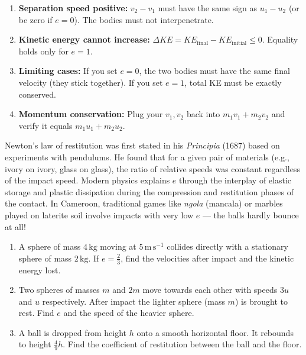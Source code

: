 \documentclass[11pt]{article}
\begin{document}
\begin{aretenir}
\begin{enumerate}
\item \textbf{Separation speed positive:} $v_2 - v_1$ must have the same sign as $u_1 - u_2$ (or be zero if $e=0$). The bodies must not interpenetrate.
\item \textbf{Kinetic energy cannot increase:} $\Delta KE = KE_{\text{final}} - KE_{\text{initial}} \le 0$. Equality holds only for $e=1$.
\item \textbf{Limiting cases:} If you set $e=0$, the two bodies must have the same final velocity (they stick together). If you set $e=1$, total KE must be exactly conserved.
\item \textbf{Momentum conservation:} Plug your $v_1, v_2$ back into $m_1v_1+m_2v_2$ and verify it equals $m_1u_1+m_2u_2$.
\end{enumerate}
\end{aretenir}

\begin{savaistu}
Newton's law of restitution was first stated in his \emph{Principia} (1687) based on experiments with pendulums. He found that for a given pair of materials (e.g., ivory on ivory, glass on glass), the ratio of relative speeds was constant regardless of the impact speed. Modern physics explains $e$ through the interplay of elastic storage and plastic dissipation during the compression and restitution phases of the contact. In Cameroon, traditional games like \emph{ngola} (mancala) or marbles played on laterite soil involve impacts with very low $e$ — the balls hardly bounce at all!
\end{savaistu}

\begin{exercice}
\begin{enumerate}
\item A sphere of mass $4\,\mathrm{kg}$ moving at $5\,\mathrm{m\,s^{-1}}$ collides directly with a stationary sphere of mass $2\,\mathrm{kg}$. If $e = \frac{2}{3}$, find the velocities after impact and the kinetic energy lost.
\item Two spheres of masses $m$ and $2m$ move towards each other with speeds $3u$ and $u$ respectively. After impact the lighter sphere (mass $m$) is brought to rest. Find $e$ and the speed of the heavier sphere.
\item A ball is dropped from height $h$ onto a smooth horizontal floor. It rebounds to height $\frac{4}{9}h$. Find the coefficient of restitution between the ball and the floor.
\end{enumerate}
\end{exercice}
\end{document}
